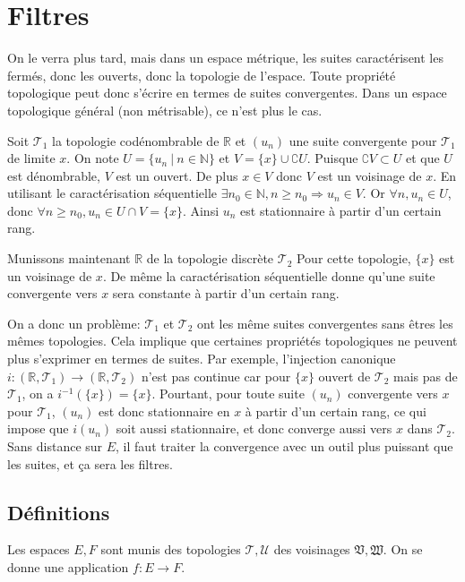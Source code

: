 \documentclass[a4paper, 11pt, french]{book}
\theoremstyle{plain} %
\theoremstyle{definition} %
\theoremstyle{remark} %
\newcommand{\1}{\mathds{1}}
\newcommand{\supegal}{\geqslant}
\newcommand{\inv}[1]{#1^{-1}}
\newcommand{\N}{\mathbb{N}}
\newcommand{\R}{\mathbb{R}}
\newcommand\ens[2]{\{#1 \ |\ #2\}}
\begin{document}
\chapter{Filtres}

On le verra plus tard, mais dans un espace métrique, les suites caractérisent les fermés, donc les ouverts, donc la topologie de l’espace.
Toute propriété topologique peut donc s’écrire en termes de suites convergentes.
Dans un espace topologique général (non métrisable), ce n’est plus le cas.

Soit $\mathscr{T}_1$ la topologie codénombrable de $\R$ et $(u_n)$ une suite convergente pour $\mathscr{T}_1$ de limite $x$.
On note $U=\ens{u_n}{n\in\N}$ et $V=\{x\}\cup\complement U$.
Puisque $\complement V\subset U$ et que $U$ est dénombrable, $V$ est un ouvert.
De plus $x\in V$ donc $V$ est un voisinage de $x$.
En utilisant le caractérisation séquentielle $\exists n_0\in\N, n\supegal n_0\Rightarrow u_n\in V$.
Or $\forall n, u_n\in U$, donc $\forall n\supegal n_0, u_n\in U\cap V=\{x\}$.
Ainsi $u_n$ est stationnaire à partir d'un certain rang.

Munissons maintenant $\R$ de la topologie discrète $\mathscr{T}_2$
Pour cette topologie, $\{x\}$ est un voisinage de $x$.
De même la caractérisation séquentielle donne qu'une suite convergente vers $x$ sera constante à partir d'un certain rang.

On a donc un problème: $\mathscr{T}_1$ et $\mathscr{T}_2$ ont les même suites convergentes sans êtres les mêmes topologies.
Cela implique que certaines propriétés topologiques ne peuvent plus s’exprimer en termes de suites.
Par exemple, l’injection canonique $i : (\R, \mathscr{T}_1)\rightarrow (\R, \mathscr{T}_2)$ n’est pas continue car pour $\{x\}$ ouvert de $\mathscr{T}_2$ mais pas de $\mathscr{T}_1$, on a $\inv{i}(\{x\})=\{x\}$.
Pourtant, pour toute suite $(u_n)$ convergente vers $x$ pour $\mathscr{T}_1$, $(u_n)$ est donc stationnaire en $x$ à partir d'un certain rang, ce qui impose que $i(u_n)$ soit aussi stationnaire, et donc converge aussi vers $x$ dans $\mathscr{T}_2$.
Sans distance sur $E$, il faut traiter la convergence avec un outil plus puissant que les suites, et ça sera les filtres.

\section{Définitions}

Les espaces $E, F$ sont munis des topologies $\mathscr{T}, \mathscr{U}$ des voisinages $\mathfrak{V}, \mathfrak{W}$.
On se donne une application $f:E\rightarrow F$.
\end{document}

